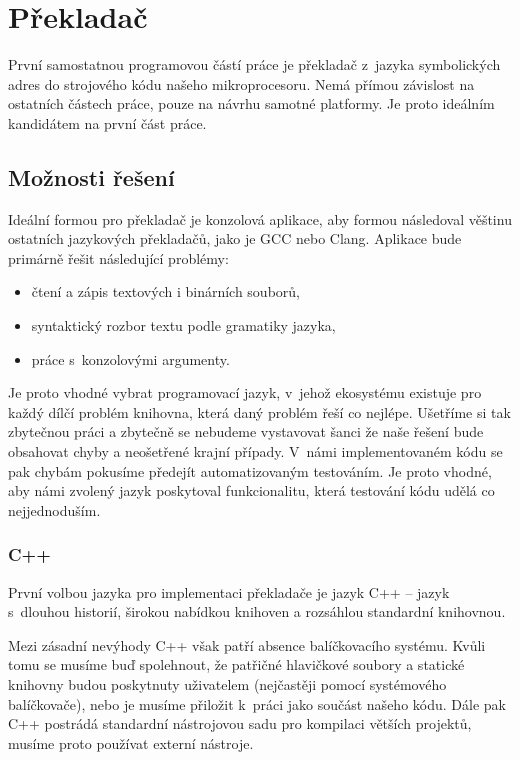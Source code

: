 \chapter{Překladač}
\label{chap:assembler}

První samostatnou programovou částí práce je překladač z~jazyka symbolických adres do strojového kódu našeho mikroprocesoru. Nemá přímou zá\-vis\-lost na ostatních částech práce, pouze na návrhu samotné platformy. Je proto ideálním kandidátem na první část práce.

\section{Možnosti řešení}

Ideální formou pro překladač je konzolová aplikace, aby formou následoval věštinu ostatních jazykových překladačů, jako je GCC nebo Clang. Aplikace bude primárně řešit následující problémy:

\begin{itemize}
	\item čtení a zápis textových i binárních souborů,
	\item syntaktický rozbor textu podle gramatiky jazyka,
	\item práce s~konzolovými argumenty.
\end{itemize}

Je proto vhodné vybrat programovací jazyk, v~jehož ekosystému existuje pro každý dílčí problém knihovna, která daný problém řeší co nejlépe. Ušetříme si tak zbytečnou práci a zbytečně se nebudeme vystavovat šanci že naše řešení bude obsahovat chyby a neošetřené krajní případy. V~námi implementovaném kódu se pak chybám pokusíme předejít automatizovaným testováním. Je proto vhodné, aby námi zvolený jazyk poskytoval funkcionalitu, která testování kódu udělá co nejjednoduším.

\subsection{C++}
\label{sec:asm-cpp}

První volbou jazyka pro implementaci překladače je jazyk C++ -- jazyk s~dlouhou historií\cite{cpp-history}, širokou nabídkou knihoven a rozsáhlou standardní knihovnou.

Mezi zásadní nevýhody C++ však patří absence balíčkovacího systému. Kvůli tomu se musíme buď spolehnout, že patřičné hlavičkové soubory a statické knihovny budou poskytnuty uživatelem (nejčastěji pomocí systémového balíčkovače), nebo je musíme přiložit k~práci jako součást našeho kódu. Dále pak C++ postrádá standardní nástrojovou sadu pro kompilaci větších projektů, musíme proto používat externí nástroje.

